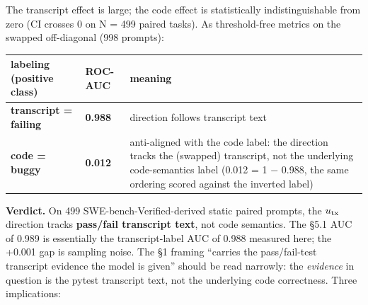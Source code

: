 \documentclass[
  11pt,
  a4paper]{article}
\newcounter{none} %
\begin{document}
The transcript effect is large; the code effect is statistically
indistinguishable from zero (CI crosses 0 on N = 499 paired tasks). As
threshold-free metrics on the swapped off-diagonal (998 prompts):

{\def\LTcaptype{none} %
\begin{longtable}[]{@{}
  >{\raggedright\arraybackslash}p{}
  >{\raggedleft\arraybackslash}p{}
  >{\raggedright\arraybackslash}p{}@{}}
\toprule\noalign{}
\begin{minipage}[b]{\linewidth}\raggedright
labeling (positive class)
\end{minipage} & \begin{minipage}[b]{\linewidth}\raggedleft
ROC-AUC
\end{minipage} & \begin{minipage}[b]{\linewidth}\raggedright
meaning
\end{minipage} \\
\midrule\noalign{}
\endhead
\bottomrule\noalign{}
\endlastfoot
\textbf{transcript = failing} & \textbf{0.988} & direction follows
transcript text \\
\textbf{code = buggy} & \textbf{0.012} & anti-aligned with the code
label: the direction tracks the (swapped) transcript, not the underlying
code-semantics label (0.012 = 1 \ensuremath{-} 0.988, the same ordering scored
against the inverted label) \\
\end{longtable}
}

\textbf{Verdict.} On 499 SWE-bench-Verified-derived static paired
prompts, the \(u_{\rm tx}\) direction tracks \textbf{pass/fail
transcript text}, not code semantics. The \S{}5.1 AUC of 0.989 is
essentially the transcript-label AUC of 0.988 measured here; the +0.001
gap is sampling noise. The \S{}1 framing ``carries the pass/fail-test
transcript evidence the model is given'' should be read narrowly: the
\emph{evidence} in question is the pytest transcript text, not the
underlying code correctness. Three implications:
\end{document}

